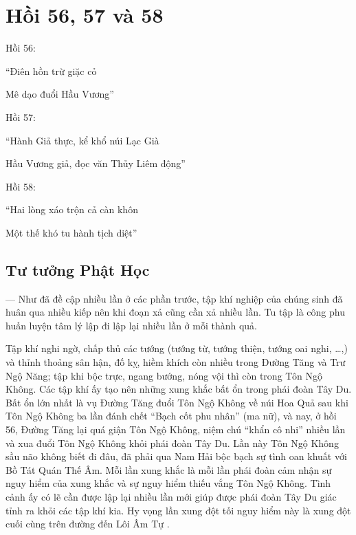 \chapter{Hồi 56, 57 và 58} %
\label{cha:hoi_56_57}

Hồi 56:

\begin{itshape}
``Điên hồn trừ giặc cỏ

Mê dạo đuổi Hầu Vương''
\end{itshape}

Hồi 57:

\begin{itshape}
``Hành Giả thực, kể khổ núi Lạc Già

Hầu Vương giả, đọc văn Thủy Liêm động''
\end{itshape}

Hồi 58:

\begin{itshape}
``Hai lòng xáo trộn cả càn khôn

Một thế khó tu hành tịch diệt''
\end{itshape}

\section{Tư tưởng Phật Học} %
\label{sec:56_57_phat_hoc}

— Như đã đề cập nhiều lần ở các phần trước, tập khí nghiệp của chúng sinh đã huân qua nhiều kiếp nên khi đoạn xả cũng cần xả nhiều lần. Tu tập là công phu huấn luyện tâm lý lập đi lập lại nhiều lần ở mỗi thành quả.

Tập khí nghi ngờ, chấp thủ các tướng (tướng từ, tướng thiện, tướng oai nghi, \ldots,) và thỉnh thoảng sân hận, đố kỵ, hiềm khích còn nhiều trong Đường Tăng và Trư Ngộ Năng; tập khi bộc trực, ngang bướng, nóng vội thì còn trong Tôn Ngộ Không. Các tập khí ấy tạo nên những xung khắc bất ổn trong phái đoàn Tây Du. Bất ổn lớn nhất là vụ Đường Tăng đuổi Tôn Ngộ Không về núi Hoa Quả sau khi Tôn Ngộ Không ba lần đánh chết ``Bạch cốt phu nhân'' (ma nữ), và nay, ở hồi 56, Đường Tăng lại quá giận Tôn Ngộ Không, niệm chú ``khẩn cô nhi'' nhiều lần và xua đuổi Tôn Ngộ Không khỏi phái đoàn Tây Du. Lần này Tôn Ngộ Không sầu não không biết đi đâu, đã phải qua Nam Hải bộc bạch sự tình oan khuất với Bồ Tát Quán Thế Âm. Mỗi lần xung khắc là mỗi lần phái đoàn cảm nhận sự nguy hiểm của xung khắc và sự nguy hiểm thiếu vắng Tôn Ngộ Không. Tình cảnh ấy có lẽ cần được lập lại nhiều lần mới giúp được phái đoàn Tây Du giác tỉnh ra khỏi các tập khí kia. Hy vọng lần xung đột tối nguy hiểm này là xung đột cuối cùng trên đường đến Lôi Âm Tự .

